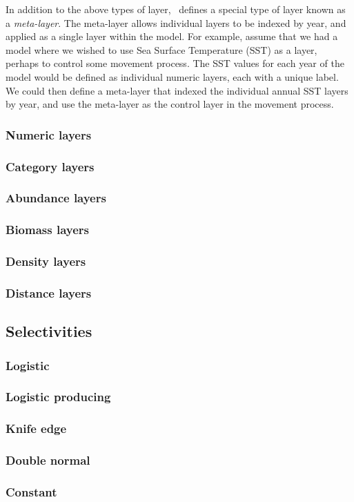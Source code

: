 In addition to the above types of layer, \SPM\ defines a special type of layer known as a \emph{meta-layer}. The meta-layer allows individual layers to be indexed by year, and applied as a single layer within the model. For example, assume that we had a model where we wished to use Sea Surface Temperature (SST) as a layer, perhaps to control some movement process. The SST values for each year of the model would be defined as individual numeric layers, each with a unique label. We could then define a meta-layer that indexed the individual annual SST layers by year, and use the meta-layer as the control layer in the movement process. 


\subsubsection{Numeric layers}

\subsubsection{Category layers}

\subsubsection{Abundance layers}

\subsubsection{Biomass layers}

\subsubsection{Density layers}

\subsubsection{Distance layers}

\subsection{Selectivities\label{sec:selectivities}}

\subsubsection{Logistic}

\subsubsection{Logistic producing}

\subsubsection{Knife edge}

\subsubsection{Double normal}

\subsubsection{Constant}
